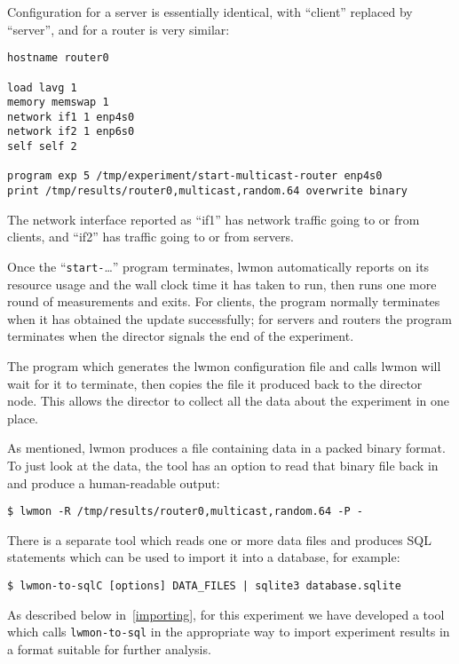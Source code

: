 \documentclass[a4paper,12pt]{article}
\begin{document}
Configuration for a server is essentially identical, with ``client''
replaced by ``server'', and for a router is very similar:

\begin{verbatim}
hostname router0

load lavg 1
memory memswap 1
network if1 1 enp4s0
network if2 1 enp6s0
self self 2

program exp 5 /tmp/experiment/start-multicast-router enp4s0
print /tmp/results/router0,multicast,random.64 overwrite binary
\end{verbatim}

The network interface reported as ``if1'' has network traffic going
to or from clients, and ``if2'' has traffic going to or from servers.

Once the ``{\tt start-}\ldots'' program terminates, lwmon automatically
reports on its resource usage and the wall clock time it has taken to run,
then runs one more round of measurements and exits.  For clients, the
program normally terminates when it has obtained the update successfully;
for servers and routers the program terminates when the director signals
the end of the experiment.

The program which generates the lwmon configuration file and calls lwmon
will wait for it to terminate, then copies the file it produced back
to the director node. This allows the director to collect all the
data about the experiment in one place.

As mentioned, lwmon produces a file containing data in a packed binary
format. To just look at the data, the tool has an option to read that
binary file back in and produce a human-readable output:

\begin{verbatim}
$ lwmon -R /tmp/results/router0,multicast,random.64 -P -
\end{verbatim}

There is a separate tool which reads one or more data files and produces
SQL statements which can be used to import it into a database, for example:

\begin{verbatim}
$ lwmon-to-sqlC [options] DATA_FILES | sqlite3 database.sqlite
\end{verbatim}

As described below in~\ref{importing}, for this experiment we have developed
a tool which calls {\tt lwmon-to-sql} in the appropriate way to import
experiment results in a format suitable for further analysis.
\end{document}
